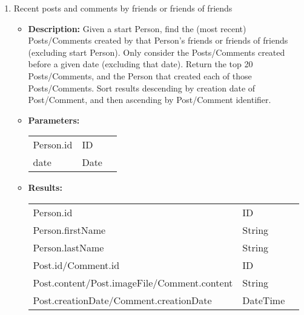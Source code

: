 {\begin{enumerate}
	\item Recent posts and comments by friends or friends of friends
	\begin{itemize}
		\item \textbf{Description:}
            Given a start Person, find the (most recent) Posts/Comments created
            by that Person's friends or friends of friends (excluding start
            Person). Only consider the Posts/Comments created before a given
            date (excluding that date). Return the top 20 Posts/Comments, and
            the Person that created each of those Posts/Comments. Sort results
            descending by creation date of Post/Comment, and then ascending by
            Post/Comment identifier.
		\item \textbf{Parameters:} \\
			\begin{tabular}{lll}
				Person.id 	 						& ID & \parbox[t]{20cm}{\par \strut} \\
				date 		 						& Date & \parbox[t]{20cm}{\par \strut} \\
			\end{tabular}		
		\item \textbf{Results:} \\
			\begin{tabular}{lll}
				Person.id 	 								& ID & \parbox[t]{20cm}{\par \strut} \\
				Person.firstName 	 						& String & \parbox[t]{20cm}{\par \strut} \\
				Person.lastName 	 						& String & \parbox[t]{20cm}{\par \strut} \\
				Post.id/Comment.id 	 						& ID & \parbox[t]{20cm}{\par \strut} \\
				Post.content/Post.imageFile/Comment.content	& String & \parbox[t]{20cm}{\par \strut} \\
				Post.creationDate/Comment.creationDate 	 	& DateTime & \parbox[t]{20cm}{\par \strut} \\
			\end{tabular}		
	\end{itemize}


\end{enumerate}}
